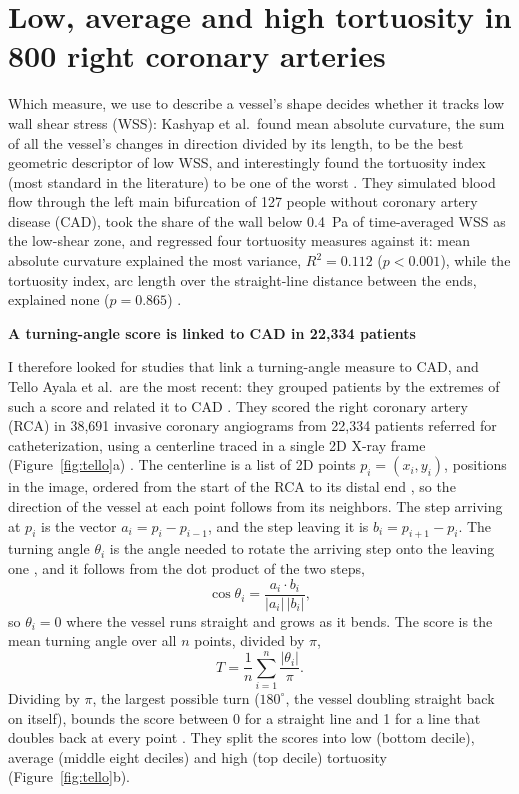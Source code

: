 \section{Low, average and high tortuosity in 800 right coronary arteries}

\medskip


\noindent Which measure, we use to describe a vessel's shape decides whether it tracks low wall shear stress
(WSS): Kashyap et al.\ found mean absolute curvature, the sum of all the vessel's changes in
direction divided by its length, to be the best geometric descriptor of low WSS, and interestingly found the tortuosity index (most standard in the literature) to be one of the worst
\cite{kashyap2022tortuosity}.
They simulated blood flow through the left main bifurcation of 127 people without coronary artery
disease (CAD), took the share of the wall below 0.4~Pa of time-averaged WSS as the low-shear zone,
and regressed four tortuosity measures against it: mean absolute curvature explained the most
variance, $R^2 = 0.112$ ($p < 0.001$), while the tortuosity index, arc length over the
straight-line distance between the ends, explained none ($p = 0.865$) \cite{kashyap2022tortuosity}.


\medskip
\noindent \textbf{A turning-angle score is linked to CAD in 22,334 patients}


\noindent I therefore looked for studies that link a turning-angle measure to CAD, and Tello Ayala
et al.\ are the most recent: they grouped patients by the extremes of such a score and related it
to CAD \cite{tello2026tortuosity}.
They scored the right coronary artery (RCA) in 38,691 invasive coronary angiograms from 22,334
patients referred for catheterization, using a centerline traced in a single 2D X-ray frame
(Figure~\ref{fig:tello}a) \cite{tello2026tortuosity}.
The centerline is a list of 2D points $p_i = (x_i, y_i)$, positions in the image, ordered from the
start of the RCA to its distal end \cite{tello2026tortuosity}, so the direction of the vessel at each
point follows from its neighbors.
The step arriving at $p_i$ is the vector $a_i = p_i - p_{i-1}$, and the step leaving it is
$b_i = p_{i+1} - p_i$.
The turning angle $\theta_i$ is the angle needed to rotate the arriving step onto the leaving one
\cite{tello2026tortuosity}, and it follows from the dot product of the two steps,
\begin{equation}
  \cos\theta_i = \frac{a_i \cdot b_i}{\lvert a_i\rvert\,\lvert b_i\rvert},
  \label{eq:turn}
\end{equation}
so $\theta_i = 0$ where the vessel runs straight and grows as it bends.
The score is the mean turning angle over all $n$ points, divided by $\pi$,
\begin{equation}
  T = \frac{1}{n}\sum_{i=1}^{n} \frac{\lvert\theta_i\rvert}{\pi}.
  \label{eq:tello}
\end{equation}
Dividing by $\pi$, the largest possible turn ($180^\circ$, the vessel doubling straight back on itself),
bounds the score between 0 for a straight line and 1 for a line that doubles back at every point
\cite{tello2026tortuosity}.
They split the scores into low (bottom decile), average (middle eight deciles) and high (top
decile) tortuosity (Figure~\ref{fig:tello}b).

